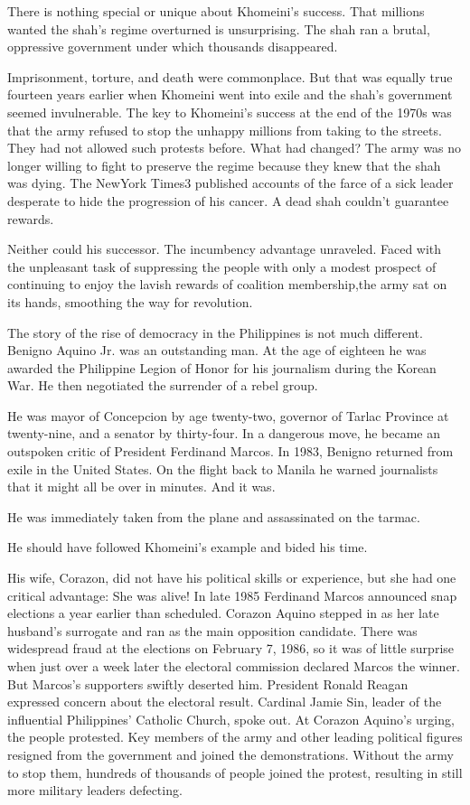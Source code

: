 \documentclass[10pt]{article}
\begin{document}
{\large There is nothing special or unique about Khomeini's success. That
millions wanted the shah's regime overturned is unsurprising. The shah ran a
brutal, oppressive government under which thousands disappeared.}

{\large Imprisonment, torture, and death were commonplace. But that was equally
true fourteen years earlier when Khomeini went into exile and the shah's
government seemed invulnerable. The key to Khomeini's success at the end of the
1970s was that the army refused to stop the unhappy millions from taking to the
streets. They had not allowed such protests before. What had changed? The army
was no longer willing to fight to preserve the regime because they knew that the
shah was dying. The NewYork Times3 published accounts of the farce of a sick
leader desperate to hide the progression of his cancer. A dead shah couldn't
guarantee rewards.}

{\large Neither could his successor. The incumbency advantage unraveled. Faced
with the unpleasant task of suppressing the people with only a modest prospect of
continuing to enjoy the lavish rewards of coalition membership,the army sat on
its hands, smoothing the way for revolution.}

{\large The story of the rise of democracy in the Philippines is not much
different. Benigno Aquino Jr. was an outstanding man. At the age of eighteen he
was awarded the Philippine Legion of Honor for his journalism during the Korean
War. He then negotiated the surrender of a rebel group.}

{\large He was mayor of Concepcion by age twenty-two, governor of Tarlac
Province at twenty-nine, and a senator by thirty-four. In a dangerous move, he
became an outspoken critic of President Ferdinand Marcos. In 1983, Benigno
returned from exile in the United States. On the flight back to Manila he warned
journalists that it might all be over in minutes. And it was.}

{\large He was immediately taken from the plane and assassinated on the tarmac.}

{\large He should have followed Khomeini's example and bided his time.}

{\large His wife, Corazon, did not have his political skills or experience, but
she had one critical advantage: She was alive! In late 1985 Ferdinand Marcos
announced snap elections a year earlier than scheduled. Corazon Aquino stepped in
as her late husband's surrogate and ran as the main opposition candidate. There
was widespread fraud at the elections on February 7, 1986, so it was of little
surprise when just over a week later the electoral commission declared Marcos the
winner. But Marcos's supporters swiftly deserted him. President Ronald Reagan
expressed concern about the electoral result. Cardinal Jamie Sin, leader of the
influential Philippines' Catholic Church, spoke out. At Corazon Aquino's urging,
the people protested. Key members of the army and other leading political figures
resigned from the government and joined the demonstrations. Without the army to
stop them, hundreds of thousands of people joined the protest, resulting in still
more military leaders defecting.}
\end{document}
